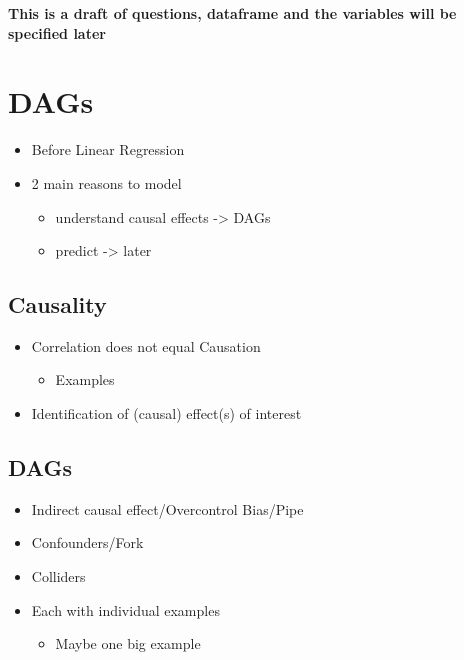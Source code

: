 \documentclass[
]{book}
\providecommand{\tightlist}{%
  \setlength{\itemsep}{0pt}\setlength{\parskip}{0pt}}
\begin{document}
\textbf{This is a draft of questions, dataframe and the variables will be specified later}

\hypertarget{dags-1}{%
\chapter{DAGs}\label{dags-1}}

\begin{itemize}
\tightlist
\item
  Before Linear Regression
\item
  2 main reasons to model

  \begin{itemize}
  \tightlist
  \item
    understand causal effects -\textgreater{} DAGs
  \item
    predict -\textgreater{} later
  \end{itemize}
\end{itemize}

\hypertarget{causality}{%
\section{Causality}\label{causality}}

\begin{itemize}
\tightlist
\item
  Correlation does not equal Causation

  \begin{itemize}
  \tightlist
  \item
    Examples
  \end{itemize}
\item
  Identification of (causal) effect(s) of interest
\end{itemize}

\hypertarget{dags}{%
\section{DAGs}\label{dags}}

\begin{itemize}
\tightlist
\item
  Indirect causal effect/Overcontrol Bias/Pipe
\item
  Confounders/Fork
\item
  Colliders
\item
  Each with individual examples

  \begin{itemize}
  \tightlist
  \item
    Maybe one big example
  \end{itemize}
\end{itemize}
\end{document}
